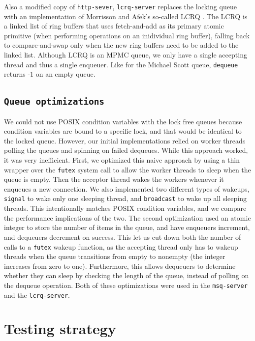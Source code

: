 \documentclass[twoside,10pt]{article}
\begin{document}
\begin{multicols}{2}
Also a modified copy of \verb+http-sever+, \verb+lcrq-server+ replaces
the locking queue with an implementation of Morrisson and Afek's
so-called LCRQ \cite{lcrq-source}. The LCRQ is a linked list of ring buffers that uses
fetch-and-add as its primary atomic primitive (when performing
operations on an inidividual ring buffer), falling back to
compare-and-swap only when the new ring buffers need to be added to
the linked list. Although LCRQ is an MPMC queue, we only have a single
accepting thread and thus a single enqueuer. Like for the Michael
Scott queue, \verb+dequeue+ returns -1 on an empty queue. 


\subsection{\texttt{Queue optimizations}}

We could not use POSIX condition variables with the lock free queues 
because condition variables are bound to a specific lock, and that would be
identical to the locked queue. However, our initial implementations relied 
on worker threads polling the queues and spinning on failed dequeues. While
this approach worked, it was very inefficient. First, we optimized this 
naive approach by using a thin wrapper over the \verb+futex+ system call
to allow the worker threads to sleep when the queue is empty. Then the
acceptor thread wakes the workers whenever it enqueues a new connection. 
We also implemented two different types of wakeups, \verb+signal+ to wake only 
one sleeping thread, and \verb+broadcast+ to wake up all sleeping threads. 
This intentionally matches POSIX condition variables, and we compare the 
performance implications of the two. The second optimization used an atomic
integer to store the number of items in the queue, and have enqueuers increment, and dequeuers decrement on success. This let us cut down both the
number of calls to a \verb+futex+ wakeup function, as the accepting thread 
only has to wakeup threads when the queue transitions from empty to 
nonempty (the integer increases from zero to one). Furthermore, this 
allows dequeuers to determine whether they can sleep by checking the length
of the queue, instead of polling on the dequeue operation. Both of these 
optimizations were used in the \verb+msq-server+ and the \verb+lcrq-server+. 



\section{Testing strategy}


\end{multicols}
\end{document}
